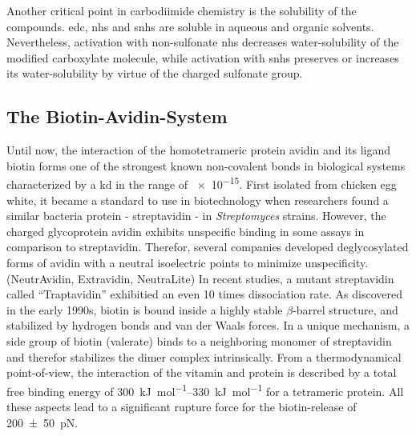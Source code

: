 Another critical point in carbodiimide chemistry is the solubility of the compounds. \gls{edc}, \gls{nhs} and \gls{snhs} are soluble in aqueous and organic solvents. Nevertheless, activation  with  non-sulfonate \gls{nhs} decreases water-solubility of the modified carboxylate molecule, while activation with \gls{snhs} preserves or increases its water-solubility by virtue of the charged sulfonate group.\cite{lit:chem:snhs}

\clearpage

\subsection{The Biotin-Avidin-System}
\label{sec:theo:biotin}
Until now, the interaction of the homotetrameric protein avidin and its ligand biotin forms one of the strongest known non-covalent bonds in biological systems characterized by a \gls{kd} in the range of \SI{e-15}{\molar}.\cite{lit:bio:biotin:avidin_discovery} First isolated from chicken egg white, it became a standard to use in biotechnology when researchers found a similar bacteria protein - streptavidin - in \textit{Streptomyces} strains.\cite{lit:bio:biotin:discovery} However, the charged glycoprotein avidin exhibits unspecific binding in some assays in comparison to streptavidin. Therefor, several companies developed deglycosylated forms of avidin with a neutral isoelectric points to minimize unspecificity. (NeutrAvidin, Extravidin, NeutraLite) In recent studies, a mutant streptavidin called ``Traptavidin'' exhibitied an even 10 times dissociation rate.\cite{lit:bio:biotin:engStrep}
As discovered in the early 1990s, biotin is bound inside a highly stable $\beta$-barrel structure, and stabilized by hydrogen bonds and van der Waals forces.\cite{lit:bio:biotin:bindingmechanism} In a unique mechanism, a side group of biotin (valerate) binds to a neighboring monomer of streptavidin and therefor stabilizes the dimer complex intrinsically.\cite{lit:bio:biotin:binding,lit:bio:biotin:freeenenergy} From a thermodynamical point-of-view, the interaction of the vitamin and protein is described by a total free binding energy of \SIrange{300}{330}{\kilo\joule\per\mole} for a tetrameric protein.\cite{lit:bio:biotin:freeenenergy}  All these aspects lead to a significant rupture force for the biotin-release of \SI{200+-50}{\pico\newton}.\cite{lit:bio:biotin:rupture}

\begin{figure}[tbph!]
	\hfill
	\label{}
\end{figure}
\clearpage

